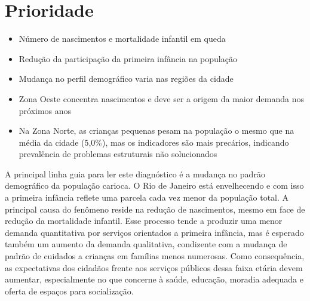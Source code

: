 
\chapter{Prioridade}\label{cap:eixo-1}

\begin{achados}\begin{itemize}

\item Número de nascimentos e mortalidade infantil em queda

\item Redução da participação da primeira infância na população

\item Mudança no perfil demográfico varia nas regiões da cidade

\item Zona Oeste concentra nascimentos e deve ser a origem da maior demanda nos próximos anos

\item Na Zona Norte, as crianças pequenas pesam na população o mesmo que na média da cidade (5,0\%), mas os indicadores são mais precários, indicando prevalência de problemas estruturais não solucionados

\end{itemize}\end{achados}

A principal linha guia para ler este diagnóstico é a mudança no padrão demográfico da população carioca. O Rio de Janeiro está envelhecendo e com isso a primeira infância reflete uma parcela cada vez menor da população total. A principal causa do fenômeno reside na redução de nascimentos, mesmo em face de redução da mortalidade infantil. Esse processo tende a produzir uma menor demanda quantitativa por serviços orientados a primeira infância, mas é esperado também um aumento da demanda qualitativa, condizente com a mudança de padrão de cuidados a crianças em famílias menos numerosas. Como consequência, as expectativas dos cidadãos frente aos serviços públicos dessa faixa etária devem aumentar, especialmente no que concerne à saúde, educação, moradia adequada e oferta de espaços para socialização.

